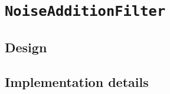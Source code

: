 \section{\texttt{NoiseAdditionFilter}}
\label{Implementation:NoiseAddition}

\subsection{Design}
\label{Implementation:NoiseAddition:Design}

\subsection{Implementation details}
\label{Implementation:NoiseAddition:Details}
